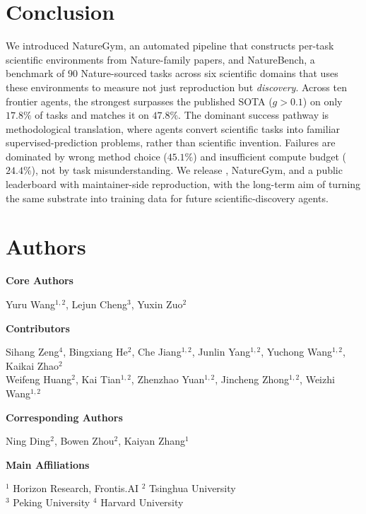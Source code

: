 \section{Conclusion}
\label{sec:conclusion}
 
\noindent
We introduced NatureGym, an automated pipeline that constructs per-task scientific environments from Nature-family papers, and NatureBench, a benchmark of $90$ Nature-sourced tasks across six scientific domains that uses these environments to measure not just reproduction but \emph{discovery}.
Across ten frontier agents, the strongest surpasses the published SOTA ($g > 0.1$) on only $17.8\%$ of tasks and matches it on $47.8\%$.
The dominant success pathway is methodological translation, where agents convert scientific tasks into familiar supervised-prediction problems, rather than scientific invention. Failures are dominated by wrong method choice ($45.1\%$) and insufficient compute budget ($24.4\%$), not by task misunderstanding.
We release \benchmark, NatureGym, and a public leaderboard with maintainer-side reproduction, with the long-term aim of turning the same substrate into training data for future scientific-discovery agents.


\section{Authors}
\label{app:contributions}

\textbf{Core Authors}

Yuru Wang$^{1, 2}$, Lejun Cheng$^3$, Yuxin Zuo$^2$

\textbf{Contributors}

Sihang Zeng$^{4}$, Bingxiang He$^{2}$, Che Jiang$^{1, 2}$, Junlin Yang$^{1, 2}$, Yuchong Wang$^{1, 2}$, Kaikai Zhao$^{2}$ \\
Weifeng Huang$^{2}$, Kai Tian$^{1, 2}$, Zhenzhao Yuan$^{1, 2}$, Jincheng Zhong$^{1, 2}$, Weizhi Wang$^{1, 2}$

\textbf{Corresponding Authors}

Ning Ding$^{2}$, Bowen Zhou$^{2}$, Kaiyan Zhang$^{1}$



\textbf{Main Affiliations}

$^1$ Horizon Research, Frontis.AI \quad $^2$ Tsinghua University \\
$^3$ Peking University \quad $^4$ Harvard University
